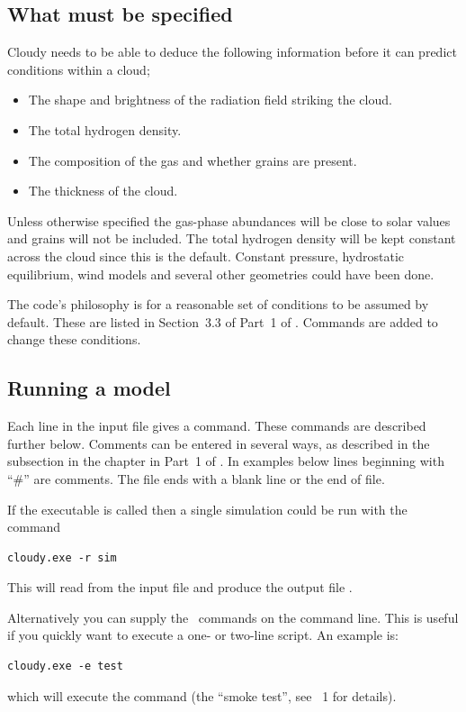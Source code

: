 \documentclass[12pt,twoside]{article}
\begin{document}
\subsection{What must be specified}

Cloudy needs to be able to deduce the following information before it
can predict conditions within a cloud;

\begin{itemize}
\item The shape and brightness of the radiation field striking the cloud.
\item The total hydrogen density.
\item The composition of the gas and whether grains are present.
\item The thickness of the cloud.
\end{itemize}

Unless otherwise specified the gas-phase abundances will
be close to solar values and grains will not be included.
The total hydrogen density will be kept constant across the cloud
since this is the default.
Constant pressure, hydrostatic equilibrium, wind models
and several other geometries could have been done.

The code's philosophy is for a reasonable set of conditions to be assumed
by default.
These are listed in Section~3.3 of Part~1 of \Hazy.
Commands are added to change these conditions.

\subsection{Running a model}

Each line in the input file gives a command.
These commands are described further below.
Comments can be entered in several ways, as described in
the subsection  in the
chapter  in
Part~1 of \Hazy.
In examples below lines beginning with ``\#'' are comments.
The file ends with a blank line or the end of file.

If the executable is called 
then a single simulation could be run with the command
\small
\begin{verbatim}
cloudy.exe -r sim
\end{verbatim}
\normalsize
This will read from the input file  and 
produce the output file . 

Alternatively you can supply the \Cloudy\ commands on the command line. This
is useful if you quickly want to execute a one- or two-line script. An example is:
\small
\begin{verbatim}
cloudy.exe -e test
\end{verbatim}
\normalsize
which will execute the command  (the ``smoke test'', see \Hazy~1
for details).
\end{document}
